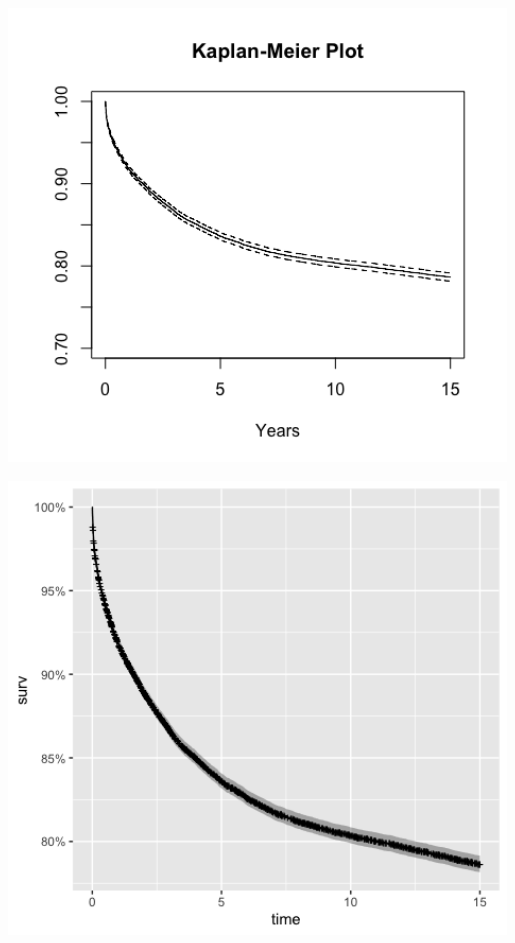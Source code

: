 \documentclass[12pt,letterpaper]{article}
\begin{document}

\includegraphics[width=0.99\textwidth]{Kaplan-Meier Plot_PS04.png}


\includegraphics[width=0.99\textwidth]{autoplot(km)_PS04.png}
\end{document}

